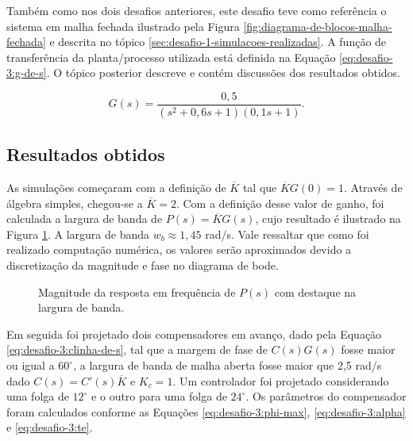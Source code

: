 Também como nos dois desafios anteriores, este desafio teve como referência o
sistema em malha fechada ilustrado pela Figura
\ref{fig:diagrama-de-blocos-malha-fechada} e descrita no tópico
\ref{sec:desafio-1-simulacoes-realizadas}. A função de transferência da
planta/processo utilizada está definida na Equação \ref{eq:desafio-3:g-de-s}. O
tópico posterior descreve e contém discussões dos resultados obtidos.

\begin{equation}
    \label{eq:desafio-3:g-de-s}
    G(s) = \frac{0,5}{(s^2 + 0,6s +1)(0,1s + 1)}.
\end{equation}

\subsection{Resultados obtidos}
As simulações começaram com a definição de $\overline{K}$ tal que
$\overline{K}G(0) = 1$. Através de álgebra simples, chegou-se a $\overline{K} = 2$.
Com a definição desse valor de ganho, foi calculada a largura de banda de $P(s)
= \overline{K}G(s)$, cujo resultado é ilustrado na Figura
\ref{fig:desafio-3:questao-3}. A largura de banda $w_{b} \approx 1,45$ rad/s.
Vale ressaltar que como foi realizado computação numérica, os valores
serão aproximados devido a discretização da magnitude e fase no diagrama de bode.

\begin{figure}[!ht]
    \caption{Magnitude da resposta em frequência de $P(s)$
    com destaque na largura de banda.}
    \vspace{-10pt}
    \hspace{-30pt}
    \label{fig:desafio-3:questao-3}
    \begin{minipage}{\linewidth}
        
    \end{minipage}
\end{figure}

Em seguida foi projetado dois compensadores em avanço, dado pela Equação
\ref{eq:desafio-3:clinha-de-s}, tal que a margem de fase de $C(s)G(s)$ fosse
maior ou igual a $60^{\circ}$, a largura de banda de malha aberta fosse maior
que 2,5 rad/s dado $C(s) = {C}'(s)\overline{K}$ e $K_{c} = 1$. Um controlador
foi projetado considerando uma folga de $12^{\circ}$ e o outro para uma folga de
$24^{\circ}$. Os parâmetros do compensador foram calculados conforme as Equações
\ref{eq:desafio-3:phi-max}, \ref{eq:desafio-3:alpha} e \ref{eq:desafio-3:te}.


